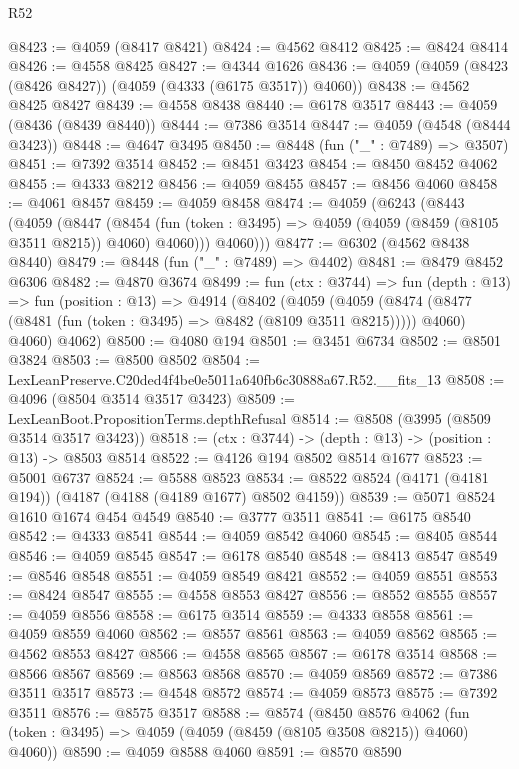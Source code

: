 \begin{lexlean}{R52}
\begin{coremodule}
@8423 := @4059 (@8417 @8421)
@8424 := @4562 @8412
@8425 := @8424 @8414
@8426 := @4558 @8425
@8427 := @4344 @1626
@8436 := @4059 (@4059 (@8423 (@8426 @8427)) (@4059 (@4333 (@6175 @3517)) @4060))
@8438 := @4562 @8425 @8427
@8439 := @4558 @8438
@8440 := @6178 @3517
@8443 := @4059 (@8436 (@8439 @8440))
@8444 := @7386 @3514
@8447 := @4059 (@4548 (@8444 @3423))
@8448 := @4647 @3495
@8450 := @8448 (fun ("_" : @7489) => @3507)
@8451 := @7392 @3514
@8452 := @8451 @3423
@8454 := @8450 @8452 @4062
@8455 := @4333 @8212
@8456 := @4059 @8455
@8457 := @8456 @4060
@8458 := @4061 @8457
@8459 := @4059 @8458
@8474 := @4059
    (@6243
      (@8443
        (@4059
          (@8447
            (@8454 (fun (token : @3495) => @4059 (@4059 (@8459 (@8105 @3511 @8215)) @4060) @4060)))
          @4060)))
@8477 := @6302 (@4562 @8438 @8440)
@8479 := @8448 (fun ("_" : @7489) => @4402)
@8481 := @8479 @8452 @6306
@8482 := @4870 @3674
@8499 := fun (ctx : @3744) =>
  fun (depth : @13) =>
  fun (position : @13) =>
  @4914
    (@8402
      (@4059
        (@4059 (@8474 (@8477 (@8481 (fun (token : @3495) => @8482 (@8109 @3511 @8215))))) @4060)
        @4060)
      @4062)
@8500 := @4080 @194
@8501 := @3451 @6734
@8502 := @8501 @3824
@8503 := @8500 @8502
@8504 := LexLeanPreserve.C20ded4f4be0e5011a640fb6c30888a67.R52.__fits_13
@8508 := @4096 (@8504 @3514 @3517 @3423)
@8509 := LexLeanBoot.PropositionTerms.depthRefusal
@8514 := @8508 (@3995 (@8509 @3514 @3517 @3423))
@8518 := (ctx : @3744) -> (depth : @13) -> (position : @13) -> @8503 @8514
@8522 := @4126 @194 @8502 @8514 @1677
@8523 := @5001 @6737
@8524 := @5588 @8523
@8534 := @8522 @8524 (@4171 (@4181 @194)) (@4187 (@4188 (@4189 @1677) @8502 @4159))
@8539 := @5071 @8524 @1610 @1674 @454 @4549
@8540 := @3777 @3511
@8541 := @6175 @8540
@8542 := @4333 @8541
@8544 := @4059 @8542 @4060
@8545 := @8405 @8544
@8546 := @4059 @8545
@8547 := @6178 @8540
@8548 := @8413 @8547
@8549 := @8546 @8548
@8551 := @4059 @8549 @8421
@8552 := @4059 @8551
@8553 := @8424 @8547
@8555 := @4558 @8553 @8427
@8556 := @8552 @8555
@8557 := @4059 @8556
@8558 := @6175 @3514
@8559 := @4333 @8558
@8561 := @4059 @8559 @4060
@8562 := @8557 @8561
@8563 := @4059 @8562
@8565 := @4562 @8553 @8427
@8566 := @4558 @8565
@8567 := @6178 @3514
@8568 := @8566 @8567
@8569 := @8563 @8568
@8570 := @4059 @8569
@8572 := @7386 @3511 @3517
@8573 := @4548 @8572
@8574 := @4059 @8573
@8575 := @7392 @3511
@8576 := @8575 @3517
@8588 := @8574
    (@8450
      @8576
      @4062
      (fun (token : @3495) => @4059 (@4059 (@8459 (@8105 @3508 @8215)) @4060) @4060))
@8590 := @4059 @8588 @4060
@8591 := @8570 @8590

\end{coremodule}
\end{lexlean}
